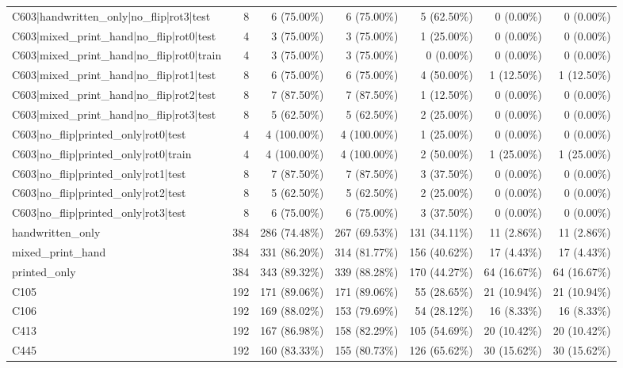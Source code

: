 \begin{longtable}{>{\raggedright\arraybackslash}p{5cm}rrrrrr}
C603|handwritten\_only|no\_flip|rot3|test & 8 & 6 (75.00\%) & 6 (75.00\%) & 5 (62.50\%) & 0 (0.00\%) & 0 (0.00\%) \\
C603|mixed\_print\_hand|no\_flip|rot0|test & 4 & 3 (75.00\%) & 3 (75.00\%) & 1 (25.00\%) & 0 (0.00\%) & 0 (0.00\%) \\
C603|mixed\_print\_hand|no\_flip|rot0|train & 4 & 3 (75.00\%) & 3 (75.00\%) & 0 (0.00\%) & 0 (0.00\%) & 0 (0.00\%) \\
C603|mixed\_print\_hand|no\_flip|rot1|test & 8 & 6 (75.00\%) & 6 (75.00\%) & 4 (50.00\%) & 1 (12.50\%) & 1 (12.50\%) \\
C603|mixed\_print\_hand|no\_flip|rot2|test & 8 & 7 (87.50\%) & 7 (87.50\%) & 1 (12.50\%) & 0 (0.00\%) & 0 (0.00\%) \\
C603|mixed\_print\_hand|no\_flip|rot3|test & 8 & 5 (62.50\%) & 5 (62.50\%) & 2 (25.00\%) & 0 (0.00\%) & 0 (0.00\%) \\
C603|no\_flip|printed\_only|rot0|test & 4 & 4 (100.00\%) & 4 (100.00\%) & 1 (25.00\%) & 0 (0.00\%) & 0 (0.00\%) \\
C603|no\_flip|printed\_only|rot0|train & 4 & 4 (100.00\%) & 4 (100.00\%) & 2 (50.00\%) & 1 (25.00\%) & 1 (25.00\%) \\
C603|no\_flip|printed\_only|rot1|test & 8 & 7 (87.50\%) & 7 (87.50\%) & 3 (37.50\%) & 0 (0.00\%) & 0 (0.00\%) \\
C603|no\_flip|printed\_only|rot2|test & 8 & 5 (62.50\%) & 5 (62.50\%) & 2 (25.00\%) & 0 (0.00\%) & 0 (0.00\%) \\
C603|no\_flip|printed\_only|rot3|test & 8 & 6 (75.00\%) & 6 (75.00\%) & 3 (37.50\%) & 0 (0.00\%) & 0 (0.00\%) \\
handwritten\_only & 384 & 286 (74.48\%) & 267 (69.53\%) & 131 (34.11\%) & 11 (2.86\%) & 11 (2.86\%) \\
mixed\_print\_hand & 384 & 331 (86.20\%) & 314 (81.77\%) & 156 (40.62\%) & 17 (4.43\%) & 17 (4.43\%) \\
printed\_only & 384 & 343 (89.32\%) & 339 (88.28\%) & 170 (44.27\%) & 64 (16.67\%) & 64 (16.67\%) \\
C105 & 192 & 171 (89.06\%) & 171 (89.06\%) & 55 (28.65\%) & 21 (10.94\%) & 21 (10.94\%) \\
C106 & 192 & 169 (88.02\%) & 153 (79.69\%) & 54 (28.12\%) & 16 (8.33\%) & 16 (8.33\%) \\
C413 & 192 & 167 (86.98\%) & 158 (82.29\%) & 105 (54.69\%) & 20 (10.42\%) & 20 (10.42\%) \\
C445 & 192 & 160 (83.33\%) & 155 (80.73\%) & 126 (65.62\%) & 30 (15.62\%) & 30 (15.62\%) \\

\end{longtable}
